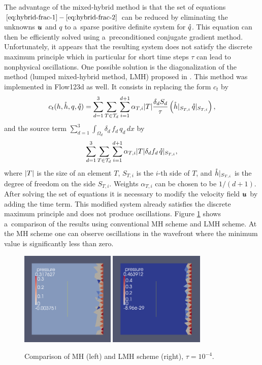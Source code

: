 The advantage of the mixed-hybrid method is that the set of equations $\eqref{eq:hybrid-frac-1} - 
\eqref{eq:hybrid-frac-2}$ can be reduced by eliminating the unknowns $\mathbf{\boldsymbol{u}}$ and $q$
to a~sparse positive definite system for $\mathring q$.
This equation can then be efficiently solved using a~preconditioned conjugate gradient method.
Unfortunately, it appears that the resulting system does not satisfy the discrete maximum principle
 which in particular for short time steps $\tau$ can lead to nonphysical oscillations.
One possible solution is the diagonalization of the method (lumped mixed-hybrid method, LMH)
 proposed in \cite{younes_2006}.
This method was implemented in Flow123d as well.
It consists in replacing the form $c_t$ by
\[
    c_t(h, \mathring h, q, \mathring q)= \sum_{d=1}^{3}\sum_{T\in \mathcal T_d}
        \sum_{i=1}^{d+1} \alpha_{T,i} \lvert T\rvert \frac{\delta_d S_d}{\tau} 
        \left(\mathring h|_{S_{T,i}}\,  \mathring q|_{S_{T,i}}\right),
\]
and the source term $\sum_{d=1}^{3}\int_{\Omega_d} \delta_{d}\,f_d\,q_{d}\,dx$ by
\[
    \sum_{d=1}^{3}\sum_{T\in \mathcal T_d}
        \sum_{i=1}^{d+1} \alpha_{T,i} \lvert T\rvert \delta_d f_d\,
        \mathring q|_{S_{T,i}},
\]
where $\lvert T\rvert$ is the size of an element $T$, $S_{T,i}$ is the $i$-th side of $T$, and 
$\mathring h|_{S_{T,i}}$ is the degree of freedom on the side $S_{T,i}$. 
Weights $\alpha_{T,i}$ can be chosen to be $1/(d+1)$. 
After solving the set of equations it is necessary to modify the velocity field $\mathbf{\boldsymbol{u}}$
 by adding the time term.
This modified system already satisfies the discrete maximum principle
 and does not produce oscillations.
Figure \ref{fig:LMH} shows a~comparison of the results
 using conventional MH scheme and LMH scheme.
At the MH scheme one can observe oscillations in the wavefront
 where the minimum value is significantly less than zero.

\begin{figure}
    \begin{center}
       \includegraphics[width=0.4\textwidth]{figures/MH.png}
       \includegraphics[width=0.405\textwidth]{figures/LMH.png}        
    \end{center}
    \caption{Comparison of MH (left) and LMH scheme (right), $\tau=10^{-4}$.}
    \label{fig:LMH}
\end{figure}

